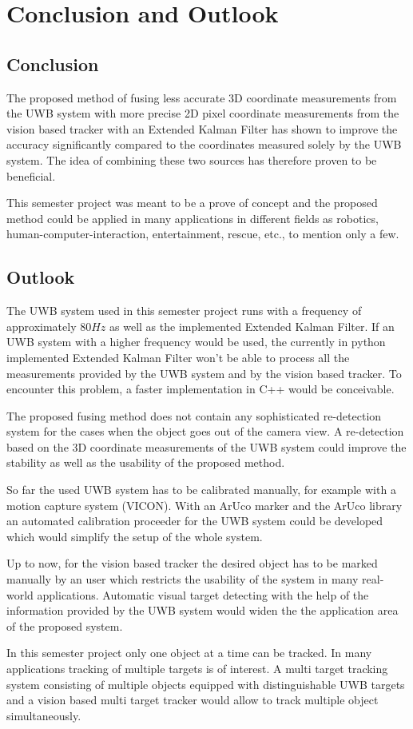 \chapter{Conclusion and Outlook}

\section{Conclusion}
The proposed method of fusing less accurate 3D coordinate measurements from the UWB system with more precise 2D pixel coordinate measurements from the vision based tracker with an Extended Kalman Filter has shown to improve the accuracy significantly compared to the coordinates measured solely by the UWB system. The idea of combining these two sources has therefore proven to be beneficial.

This semester project was meant to be a prove of concept and the proposed method could be applied in many applications in different fields as robotics, human-computer-interaction, entertainment, rescue, etc., to mention only a few.

\section{Outlook}
The UWB system used in this semester project runs with a frequency of approximately $80\mathit{Hz}$ as well as the implemented Extended Kalman Filter. If an UWB system with a higher frequency would be used, the currently in python implemented Extended Kalman Filter won't be able to process all the measurements provided by the UWB system and by the vision based tracker. To encounter this problem, a faster implementation in C++ would be conceivable.

The proposed fusing method does not contain any sophisticated re-detection system for the cases when the object goes out of the camera view. A re-detection based on the 3D coordinate measurements of the UWB system could improve the stability as well as the usability of the proposed method.

So far the used UWB system has to be calibrated manually, for example with a motion capture system (VICON). With an ArUco marker and the ArUco library \cite{Aruco2014} an automated calibration proceeder for the UWB system could be developed which would simplify the setup of the whole system. 

Up to now, for the vision based tracker the desired object has to be marked manually by an user which restricts the usability of the system in many real-world applications. Automatic visual target detecting with the help of the information provided by the UWB system would widen the the application area of the proposed system.

In this semester project only one object at a time can be tracked. In many applications tracking of multiple targets is of interest. A multi target tracking system consisting of multiple objects equipped with distinguishable UWB targets and a vision based multi target tracker would allow to track multiple object simultaneously. 
